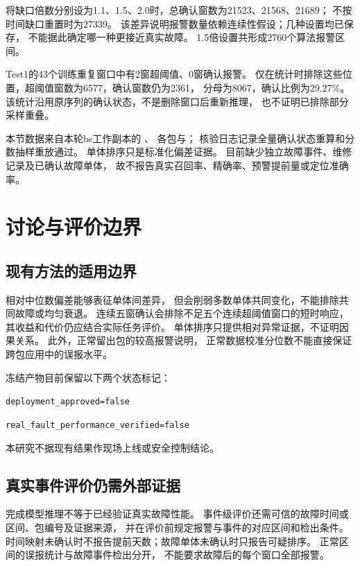 \documentclass[UTF8,a4paper,12pt,fontset=fandol]{ctexart}
\newcommand{\code}[1]{\texttt{#1}}
\begin{document}
将缺口倍数分别设为1.1、1.5、2.0时，总确认窗数为21523、21568、21689；
不按时间缺口重置时为27339。
该差异说明报警数量依赖连续性假设；几种设置均已保存，
不能据此确定哪一种更接近真实故障。
1.5倍设置共形成2760个算法报警区间。

Test1的43个训练重复窗口中有2窗超阈值、0窗确认报警。
仅在统计时排除这些位置，超阈值窗数为6577，确认窗数仍为2361，
分母为8067，确认比例为29.27\%。
该统计沿用原序列的确认状态，不是删除窗口后重新推理，
也不证明已排除部分采样重叠。

本节数据来自本轮bs工作副本的
、
各包与；
核验日志记录全量确认状态重算和分数抽样重放通过。
单体排序只是标准化偏差证据。
目前缺少独立故障事件、维修记录及已确认故障单体，
故不报告真实召回率、精确率、预警提前量或定位准确率。

\section{讨论与评价边界}

\subsection{现有方法的适用边界}

相对中位数偏差能够表征单体间差异，
但会削弱多数单体共同变化，不能排除共同故障或均匀衰退。
连续五窗确认会排除不足五个连续超阈值窗口的短时响应，
其收益和代价仍应结合实际任务评价。
单体排序只提供相对异常证据，不证明因果关系。
此外，正常留出包的较高报警说明，
正常数据校准分位数不能直接保证跨包应用中的误报水平。

冻结产物目前保留以下两个状态标记：\par
\noindent\code{deployment\_approved=false}\par
\noindent\code{real\_fault\_performance\_verified=false}\par
本研究不据现有结果作现场上线或安全控制结论。

\subsection{真实事件评价仍需外部证据}

完成模型推理不等于已经验证真实故障性能。
事件级评价还需可信的故障时间或区间、包编号及证据来源，
并在评价前规定报警与事件的对应区间和检出条件。
时间映射未确认时不报告提前天数；故障单体未确认时只报告可疑排序。
正常区间的误报统计与故障事件检出分开，
不能要求故障后的每个窗口全部报警。
\end{document}
